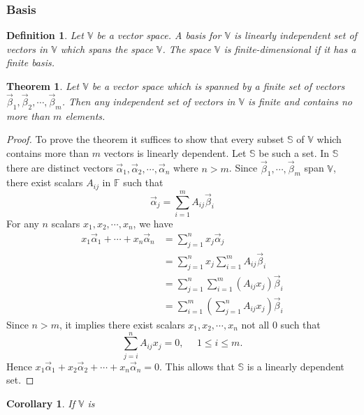 \documentclass{article}
\newtheorem*{definition}{Definition}
\newtheorem{theorem}{Theorem}
\newtheorem*{corollary}{Corollary}
\begin{document}
    \subsubsection{Basis}
    \begin{definition}
        Let \(\mathbb{V}\) be a vector space. A basis for \(\mathbb{V}\) is linearly
        independent set of vectors in \(\mathbb{V}\) which spans the space \(\mathbb{V}\).
        The space \(\mathbb{V}\) is finite-dimensional if it has a finite basis.
    \end{definition}
    \begin{theorem}
        Let \(\mathbb{V}\) be a vector space which is spanned by a finite set of vectors 
        \(\vec{\beta}_1, \vec{\beta}_2, \cdots, \vec{\beta}_m\). Then any independent set 
        of vectors in \(\mathbb{V}\) is finite and contains no more than \(m\) elements.
    \end{theorem}
    \begin{proof}
        To prove the theorem it suffices to show that every subset \(\mathbb{S}\) of
        \(\mathbb{V}\) which contains more than \(m\) vectors is linearly dependent.
        Let \(\mathbb{S}\) be such a set. In \(\mathbb{S}\) there are distinct vectors 
        \(\vec{\alpha}_1, \vec{\alpha}_2, \cdots, \vec{\alpha}_n\) where \(n > m\). 
        Since \(\vec{\beta}_1, \cdots, \vec{\beta}_m\) span \(\mathbb{V}\), there exist
        scalars \(A_{ij}\) in \(\mathbb{F}\) such that 
        \begin{equation*}
            \vec{\alpha}_j = \sum_{i=1}^{m} A_{ij} \vec{\beta}_i
        \end{equation*}
        For any \(n\) scalars \(x_1, x_2, \cdots, x_n\), we have 
        \begin{equation*}
            \begin{split}
                x_1 \vec{\alpha}_1 + \cdots + x_n \vec{\alpha}_n &= \sum_{j=1}^{n} x_{j} \vec{\alpha}_j \\
                                                                 &= \sum_{j=1}^{n} x_{j} \sum_{i=1}^{m} A_{ij} \vec{\beta}_i \\
                                                                 &= \sum_{j=1}^{n} \sum_{i=1}^{m} (A_{ij} x_j) \vec{\beta}_{i} \\
                                                                 &= \sum_{i=1}^{m} (\sum_{j=1}^{n} A_{ij}x_{j}) \vec{\beta}_{i}
            \end{split}
        \end{equation*}
        Since \(n > m\), it implies there exist scalars \(x_1, x_2, \cdots, x_n\) not all \(0\) such that 
        \begin{equation*}
            \sum_{j=i}^{n} A_{ij}x_j=0, \ \ \ \ \ \ 1 \leq i \leq m.
        \end{equation*}
        Hence \(x_1 \vec{\alpha}_1 + x_2 \vec{\alpha}_2 + \cdots + x_n \vec{\alpha}_n = 0\). 
        This allows that \(\mathbb{S}\) is a linearly dependent set.
    \end{proof}
    \begin{corollary}
        If \(\mathbb{V}\) is 
    \end{corollary}
\end{document}

